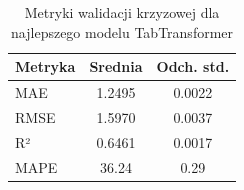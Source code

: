 \begin{table}[h]
\centering
\caption{Metryki walidacji krzyzowej dla najlepszego modelu TabTransformer}
\label{tab:cv_metrics_tabtransformer}
\begin{tabular}{lcc}
\toprule
Metryka & Srednia & Odch. std. \\
\midrule
MAE & 1.2495 & 0.0022 \\
RMSE & 1.5970 & 0.0037 \\
R² & 0.6461 & 0.0017 \\
MAPE & 36.24 & 0.29 \\
\bottomrule
\end{tabular}
\end{table}
